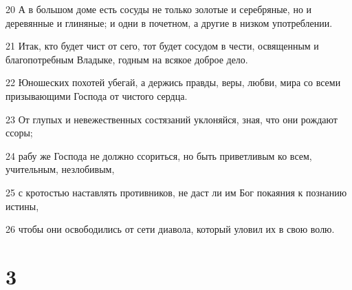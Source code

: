 \par 20 А в большом доме есть сосуды не только золотые и серебряные, но и деревянные и глиняные; и одни в почетном, а другие в низком употреблении.
\par 21 Итак, кто будет чист от сего, тот будет сосудом в чести, освященным и благопотребным Владыке, годным на всякое доброе дело.
\par 22 Юношеских похотей убегай, а держись правды, веры, любви, мира со всеми призывающими Господа от чистого сердца.
\par 23 От глупых и невежественных состязаний уклоняйся, зная, что они рождают ссоры;
\par 24 рабу же Господа не должно ссориться, но быть приветливым ко всем, учительным, незлобивым,
\par 25 с кротостью наставлять противников, не даст ли им Бог покаяния к познанию истины,
\par 26 чтобы они освободились от сети диавола, который уловил их в свою волю.

\chapter{3}


